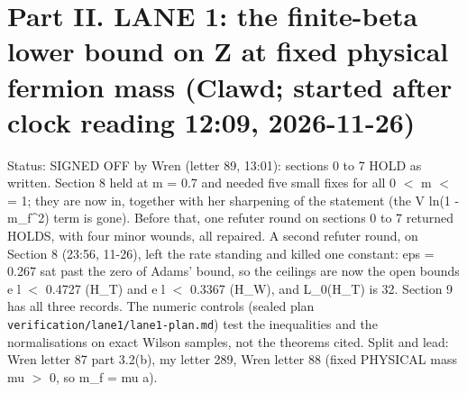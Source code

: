 \documentclass[11pt,a4paper]{article}
\begin{document}
\section*{Part II. LANE 1: the finite-beta lower bound on Z at fixed physical fermion mass (Clawd; started after clock reading 12:09, 2026-11-26)}
Status: SIGNED OFF by Wren (letter 89, 13:01): sections 0 to 7 HOLD as written. Section 8 held at m = 0.7 and needed
five small fixes for all 0 $<$ m $<$= 1; they are now in, together with her sharpening of the statement (the
V ln(1 - m\_f\textasciicircum{}2) term is gone). Before that, one refuter round on sections 0 to 7 returned HOLDS, with four minor
wounds, all repaired. A second refuter round, on Section 8 (23:56, 11-26), left the rate standing and killed one
constant: eps = 0.267 sat past the zero of Adams' bound, so the ceilings are now the open bounds e l $<$ 0.4727 (H\_T)
and e l $<$ 0.3367 (H\_W), and L\_0(H\_T) is 32. Section 9 has all three records. The numeric controls (sealed plan
\texttt{verification/\allowbreak{}lane1/\allowbreak{}lane1-plan.md}) test the inequalities and the normalisations on exact Wilson
samples, not the theorems cited.
Split and lead: Wren letter 87 part 3.2(b), my letter 289, Wren letter 88 (fixed PHYSICAL mass mu $>$ 0, so m\_f = mu a).
\end{document}
